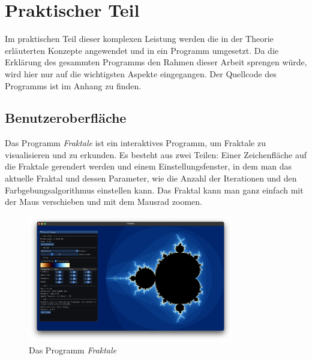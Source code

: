 \chapter{Praktischer Teil}
\thispagestyle{fancy} %
Im praktischen Teil dieser komplexen Leistung werden die in der Theorie erläuterten Konzepte angewendet und in ein Programm umgesetzt. \newline Da die Erklärung des gesammten Programms den Rahmen dieser Arbeit sprengen würde, wird hier nur auf die wichtigsten Aspekte eingegangen. Der Quellcode des Programms ist im Anhang zu finden.

\section{Benutzeroberfläche}
Das Programm \textit{Fraktale} ist ein interaktives Programm, um Fraktale zu
visualisieren und zu erkunden. \newline Es besteht aus zwei Teilen: Einer
Zeichenfläche auf die Fraktale gerendert werden und einem Einstellungsfenster,
in dem man das aktuelle Fraktal und dessen Parameter, wie die Anzahl der
Iterationen und den Farbgebungsalgorithmus einstellen kann. Das Fraktal kann
man ganz einfach mit der Maus verschieben und mit dem Mausrad zoomen.

\begin{figure}[H]
    \centering
    \includegraphics[width=0.8\textwidth]{img/Programm.png}
    \caption{Das Programm \textit{Fraktale}}
\end{figure}

